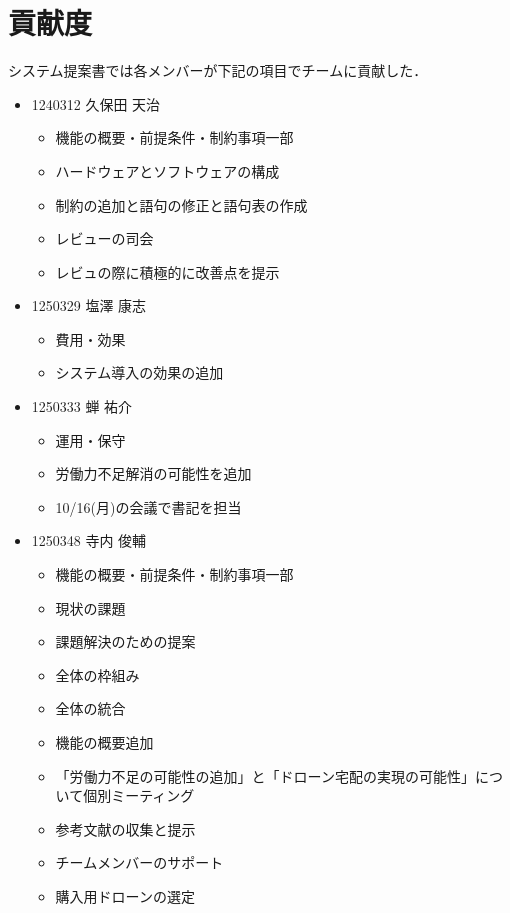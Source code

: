\documentclass[a4paper, titlepage]{jsarticle}
\begin{document}
\section{貢献度}
システム提案書では各メンバーが下記の項目でチームに貢献した．
\begin{itemize}
  \item 1240312 久保田 天治
        \begin{itemize}
          \item 機能の概要・前提条件・制約事項一部
          \item ハードウェアとソフトウェアの構成
          \item 制約の追加と語句の修正と語句表の作成
          \item レビューの司会
          \item レビュの際に積極的に改善点を提示
        \end{itemize}
  \item 1250329 塩澤 康志
        \begin{itemize}
          \item 費用・効果
          \item システム導入の効果の追加
        \end{itemize}
  \item 1250333 蝉 祐介
        \begin{itemize}
          \item 運用・保守
          \item 労働力不足解消の可能性を追加
          \item 10/16(月)の会議で書記を担当
        \end{itemize}
  \item 1250348 寺内 俊輔
        \begin{itemize}
          \item 機能の概要・前提条件・制約事項一部
          \item 現状の課題
          \item 課題解決のための提案
          \item 全体の枠組み
          \item 全体の統合
          \item 機能の概要追加
          \item 「労働力不足の可能性の追加」と「ドローン宅配の実現の可能性」について個別ミーティング
          \item 参考文献の収集と提示
          \item チームメンバーのサポート
          \item 購入用ドローンの選定

\end{itemize}
\end{itemize}
\end{document}
